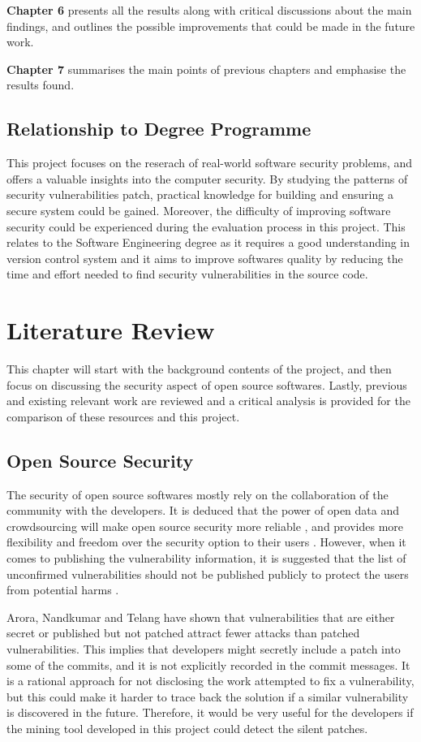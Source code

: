 \documentclass[12pt, a4paper]{report}
\begin{document}
\noindent\textbf{Chapter 6} presents all the results along with critical discussions about the main
findings,	and outlines the possible improvements that could be made in the future work.

\noindent\textbf{Chapter 7} summarises the main points of previous chapters and emphasise the
results found.

\section{Relationship to Degree Programme}
This project focuses on the reserach of real-world software security problems, and offers a valuable
insights into the computer security. By studying the patterns of security vulnerabilities patch,
practical knowledge for building and ensuring a secure system could be gained. Moreover, the
difficulty of improving software security could be experienced during the evaluation process in this
project. This relates to the Software Engineering degree as it requires a good understanding in
version control system and it aims to improve softwares quality by reducing the time and effort
needed to find security vulnerabilities in the source code.

\chapter{Literature Review}
This chapter will start with the background contents of the project, and then focus on discussing
the security aspect of open source softwares. Lastly, previous and existing relevant work are
reviewed and a critical analysis is provided for the comparison of these resources and this project.

\section{Open Source Security}
The security of open source softwares mostly rely on the collaboration of the community with the
developers. It is deduced that the power of open data and crowdsourcing will make open source
security more reliable \cite{hoepman_2007, witten_2001}, and provides more flexibility and freedom
over the security option to their users \cite{payne_2002}. However, when it comes to publishing the
vulnerability information, it is suggested that the list of unconfirmed vulnerabilities should not
be published publicly to protect the users from potential harms \cite{schryen_2011}.

Arora, Nandkumar and Telang \cite{arora_2006} have shown that vulnerabilities that are either secret
or published but not patched attract fewer attacks than patched vulnerabilities. This implies that
developers might secretly include a patch into some of the commits, and it is not explicitly
recorded in the commit messages. It is a rational approach for not disclosing the work attempted to
fix a vulnerability, but this could make it harder to trace back the solution if a similar
vulnerability is discovered in the future. Therefore, it would be very useful for the developers if
the mining tool developed in this project could detect the silent patches.
\end{document}
